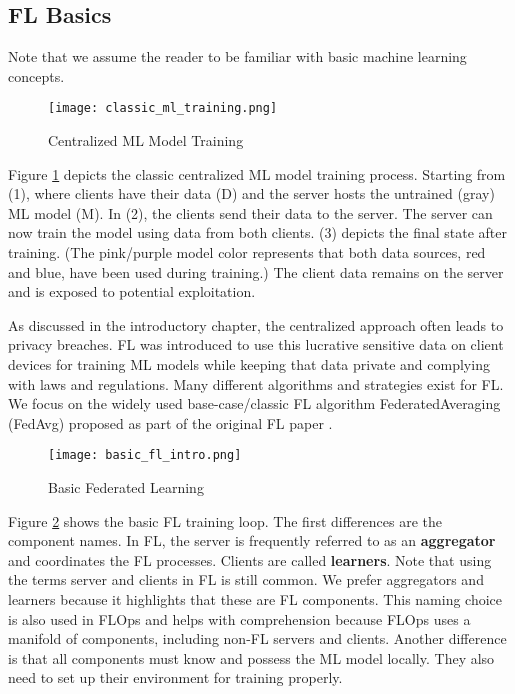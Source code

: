 
\subsection{FL Basics}

Note that we assume the reader to be familiar with basic machine learning concepts.

\begin{figure}[h]
    \centering
    \texttt{[image: classic\_ml\_training.png]}
    \caption{Centralized ML Model Training}
    \label{fig:classic_ml_training}
\end{figure}
Figure \ref{fig:classic_ml_training} depicts the classic centralized ML model training process.
Starting from (1), where clients have their data (D) and
the server hosts the untrained (gray) ML model (M).
In (2), the clients send their data to the server.
The server can now train the model using data from both clients.
(3) depicts the final state after training.
(The pink/purple model color represents that both data sources, red and blue,
have been used during training.)
The client data remains on the server and is exposed to potential exploitation.

As discussed in the introductory chapter, the centralized approach often leads to
privacy breaches. FL was introduced to use this lucrative sensitive data
on client devices for training ML models while keeping that data private and 
complying with laws and regulations.
Many different algorithms and strategies exist for FL.
We focus on the widely used base-case/classic FL algorithm FederatedAveraging (FedAvg)
proposed as part of the original FL paper \cite{paper:original_fl}.

\begin{figure}%
    \centering
    \texttt{[image: basic\_fl\_intro.png]}
    \caption{Basic Federated Learning}
    \label{fig:basic_fl_intro}
\end{figure}
Figure \ref{fig:basic_fl_intro} shows the basic FL training loop.
The first differences are the component names.
In FL, the server is frequently referred to as an \textbf{aggregator}
and coordinates the FL processes.
Clients are called \textbf{learners}.
Note that using the terms server and clients in FL is still common.
We prefer aggregators and learners because it highlights that these are FL components.
This naming choice is also used in FLOps and helps with comprehension
because FLOps uses a manifold of components, including non-FL servers and clients.
Another difference is that all components must know and possess the ML model locally.
They also need to set up their environment for training properly.

